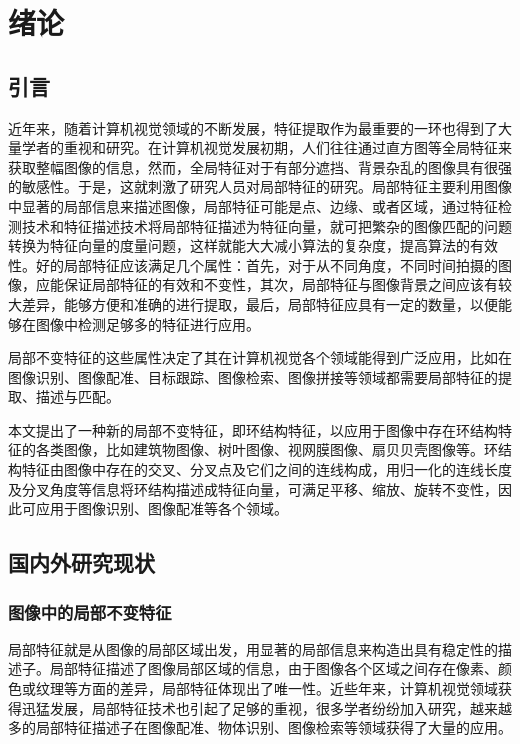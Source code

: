 

\chapter{绪论}
\label{cha:intro}


\section{引言}
\label{}

近年来，随着计算机视觉领域的不断发展，特征提取作为最重要的一环也得到了大量学者的重视和研究\cite{shipeng}。在计算机视觉发展初期，人们往往通过直方图等全局特征来获取整幅图像的信息\cite{liuying}，然而，全局特征对于有部分遮挡、背景杂乱的图像具有很强的敏感性。于是，这就刺激了研究人员对局部特征的研究。局部特征主要利用图像中显著的局部信息来描述图像，局部特征可能是点、边缘、或者区域，通过特征检测技术和特征描述技术将局部特征描述为特征向量，就可把繁杂的图像匹配的问题转换为特征向量的度量问题，这样就能大大减小算法的复杂度，提高算法的有效性。好的局部特征应该满足几个属性：首先，对于从不同角度，不同时间拍摄的图像，应能保证局部特征的有效和不变性，其次，局部特征与图像背景之间应该有较大差异，能够方便和准确的进行提取，最后，局部特征应具有一定的数量，以便能够在图像中检测足够多的特征进行应用。

局部不变特征的这些属性决定了其在计算机视觉各个领域能得到广泛应用，比如在图像识别、图像配准、目标跟踪、图像检索、图像拼接等领域都需要局部特征的提取、描述与匹配。

本文提出了一种新的局部不变特征，即环结构特征，以应用于图像中存在环结构特征的各类图像，比如建筑物图像、树叶图像、视网膜图像、扇贝贝壳图像等。环结构特征由图像中存在的交叉、分叉点及它们之间的连线构成，用归一化的连线长度及分叉角度等信息将环结构描述成特征向量，可满足平移、缩放、旋转不变性，因此可应用于图像识别、图像配准等各个领域。


\section{国内外研究现状}
\label{} 



\subsection{图像中的局部不变特征}
\label{}

局部特征就是从图像的局部区域出发，用显著的局部信息来构造出具有稳定性的描述子。局部特征描述了图像局部区域的信息，由于图像各个区域之间存在像素、颜色或纹理等方面的差异，局部特征体现出了唯一性。近些年来，计算机视觉领域获得迅猛发展，局部特征技术也引起了足够的重视，很多学者纷纷加入研究，越来越多的局部特征描述子在图像配准、物体识别、图像检索等领域获得了大量的应用。

